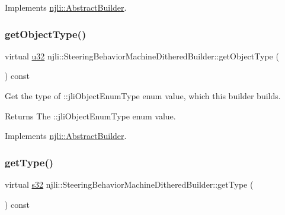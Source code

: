 Implements \mbox{\hyperlink{classnjli_1_1_abstract_builder_a902f73ea78031b06aca183a417f3413b}{njli\+::\+Abstract\+Builder}}.

\mbox{\label{classnjli_1_1_steering_behavior_machine_dithered_builder_ade764e05d0adf7b39718660fc61f8478}} 
\subsubsection{\texorpdfstring{get\+Object\+Type()}{getObjectType()}}
{\footnotesize\ttfamily virtual \mbox{\hyperlink{_util_8h_a10e94b422ef0c20dcdec20d31a1f5049}{u32}} njli\+::\+Steering\+Behavior\+Machine\+Dithered\+Builder\+::get\+Object\+Type (\begin{DoxyParamCaption}{ }\end{DoxyParamCaption}) const\hspace{0.3cm}{\ttfamily [virtual]}}

Get the type of \+::jli\+Object\+Enum\+Type enum value, which this builder builds.

\begin{DoxyReturn}{Returns}
The \+::jli\+Object\+Enum\+Type enum value. 
\end{DoxyReturn}


Implements \mbox{\hyperlink{classnjli_1_1_abstract_builder_a0f2d344fcf697b167f4f2b1122b5fb33}{njli\+::\+Abstract\+Builder}}.

\mbox{\label{classnjli_1_1_steering_behavior_machine_dithered_builder_a836f48abd9a02c81331b4edf8a2ffe0e}} 
\subsubsection{\texorpdfstring{get\+Type()}{getType()}}
{\footnotesize\ttfamily virtual \mbox{\hyperlink{_util_8h_aa62c75d314a0d1f37f79c4b73b2292e2}{s32}} njli\+::\+Steering\+Behavior\+Machine\+Dithered\+Builder\+::get\+Type (\begin{DoxyParamCaption}{ }\end{DoxyParamCaption}) const\hspace{0.3cm}{\ttfamily [virtual]}}

